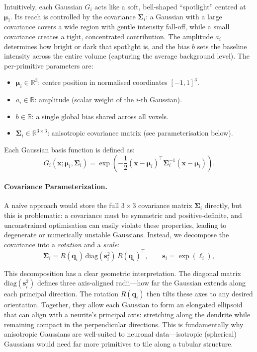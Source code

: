\documentclass[11pt,a4paper]{article}
\begin{document}
Intuitively, each Gaussian $G_i$ acts like a soft, bell-shaped ``spotlight'' centred at $\boldsymbol{\mu}_i$.  Its reach is controlled by the covariance $\boldsymbol{\Sigma}_i$: a Gaussian with a large covariance covers a wide region with gentle intensity fall-off, while a small covariance creates a tight, concentrated contribution.  The amplitude $a_i$ determines how bright or dark that spotlight is, and the bias $b$ sets the baseline intensity across the entire volume (capturing the average background level).
The per-primitive parameters are:
\begin{itemize}
    \item $\boldsymbol{\mu}_i \in \mathbb{R}^3$: centre position in normalised coordinates $[-1,1]^3$.
    \item $a_i \in \mathbb{R}$: amplitude (scalar weight of the $i$-th Gaussian).
    \item $b \in \mathbb{R}$: a single global bias shared across all voxels.
    \item $\boldsymbol{\Sigma}_i \in \mathbb{R}^{3\times 3}$: anisotropic covariance matrix (see parameterisation below).
\end{itemize}
Each Gaussian basis function is defined as:
\begin{equation}
G_i(\mathbf{x};\boldsymbol{\mu}_i,\boldsymbol{\Sigma}_i)
= \exp\!\left(
-\frac{1}{2}(\mathbf{x}-\boldsymbol{\mu}_i)^\top \boldsymbol{\Sigma}_i^{-1}(\mathbf{x}-\boldsymbol{\mu}_i)
\right).
\label{eq:gaussian_basis}
\end{equation}

\paragraph{Covariance Parameterization.}
A na\"ive approach would store the full $3\times3$ covariance matrix $\boldsymbol{\Sigma}_i$ directly, but this is problematic: a covariance must be symmetric and positive-definite, and unconstrained optimisation can easily violate these properties, leading to degenerate or numerically unstable Gaussians.  Instead, we decompose the covariance into a \emph{rotation} and a \emph{scale}:
\begin{equation}
\boldsymbol{\Sigma}_i = R(\mathbf{q}_i)\,\mathrm{diag}(\mathbf{s}_i^2)\,R(\mathbf{q}_i)^\top,
\qquad \mathbf{s}_i = \exp(\boldsymbol{\ell}_i),
\label{eq:covariance_param}
\end{equation}

This decomposition has a clear geometric interpretation.  The diagonal matrix $\mathrm{diag}(\mathbf{s}_i^2)$ defines three axis-aligned radii---how far the Gaussian extends along each principal direction.  The rotation $R(\mathbf{q}_i)$ then tilts these axes to any desired orientation.  Together, they allow each Gaussian to form an elongated ellipsoid that can align with a neurite's principal axis: stretching along the dendrite while remaining compact in the perpendicular directions.  This is fundamentally why anisotropic Gaussians are well-suited to neuronal data---isotropic (spherical) Gaussians would need far more primitives to tile along a tubular structure.
\end{document}
